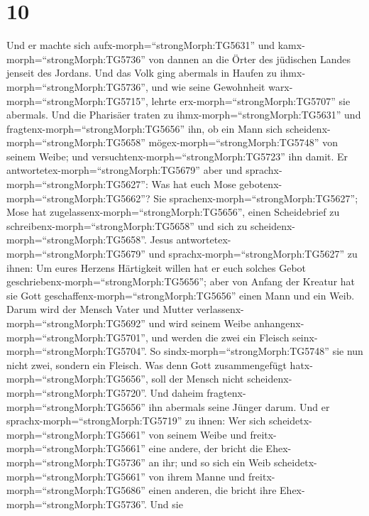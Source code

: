 \hypertarget{section-9}{%
\section{10}\label{section-9}}

 Und er machte sich aufx-morph=``strongMorph:TG5631'' und
kamx-morph=``strongMorph:TG5736'' von dannen an die Örter des jüdischen
Landes jenseit des Jordans. Und das Volk ging abermals in Haufen zu
ihmx-morph=``strongMorph:TG5736'', und wie seine Gewohnheit
warx-morph=``strongMorph:TG5715'', lehrte
erx-morph=``strongMorph:TG5707'' sie abermals.  Und die
Pharisäer traten zu ihmx-morph=``strongMorph:TG5631'' und
fragtenx-morph=``strongMorph:TG5656'' ihn, ob ein Mann sich
scheidenx-morph=``strongMorph:TG5658''
mögex-morph=``strongMorph:TG5748'' von seinem Weibe; und
versuchtenx-morph=``strongMorph:TG5723'' ihn damit.  Er
antwortetex-morph=``strongMorph:TG5679'' aber und
sprachx-morph=``strongMorph:TG5627'': Was hat euch Mose
gebotenx-morph=``strongMorph:TG5662''?  Sie
sprachenx-morph=``strongMorph:TG5627''; Mose hat
zugelassenx-morph=``strongMorph:TG5656'', einen Scheidebrief zu
schreibenx-morph=``strongMorph:TG5658'' und sich zu
scheidenx-morph=``strongMorph:TG5658''.  Jesus
antwortetex-morph=``strongMorph:TG5679'' und
sprachx-morph=``strongMorph:TG5627'' zu ihnen: Um eures Herzens
Härtigkeit willen hat er euch solches Gebot
geschriebenx-morph=``strongMorph:TG5656'';  aber von Anfang
der Kreatur hat sie Gott geschaffenx-morph=``strongMorph:TG5656'' einen
Mann und ein Weib.  Darum wird der Mensch Vater und Mutter
verlassenx-morph=``strongMorph:TG5692'' und wird seinem Weibe
anhangenx-morph=``strongMorph:TG5701'',  und werden die zwei
ein Fleisch seinx-morph=``strongMorph:TG5704''. So
sindx-morph=``strongMorph:TG5748'' sie nun nicht zwei, sondern ein
Fleisch.  Was denn Gott zusammengefügt
hatx-morph=``strongMorph:TG5656'', soll der Mensch nicht
scheidenx-morph=``strongMorph:TG5720''.  Und daheim
fragtenx-morph=``strongMorph:TG5656'' ihn abermals seine Jünger darum.
 Und er sprachx-morph=``strongMorph:TG5719'' zu ihnen: Wer
sich scheidetx-morph=``strongMorph:TG5661'' von seinem Weibe und
freitx-morph=``strongMorph:TG5661'' eine andere, der bricht die
Ehex-morph=``strongMorph:TG5736'' an ihr;  und so sich ein
Weib scheidetx-morph=``strongMorph:TG5661'' von ihrem Manne und
freitx-morph=``strongMorph:TG5686'' einen anderen, die bricht ihre
Ehex-morph=``strongMorph:TG5736''.  Und sie
